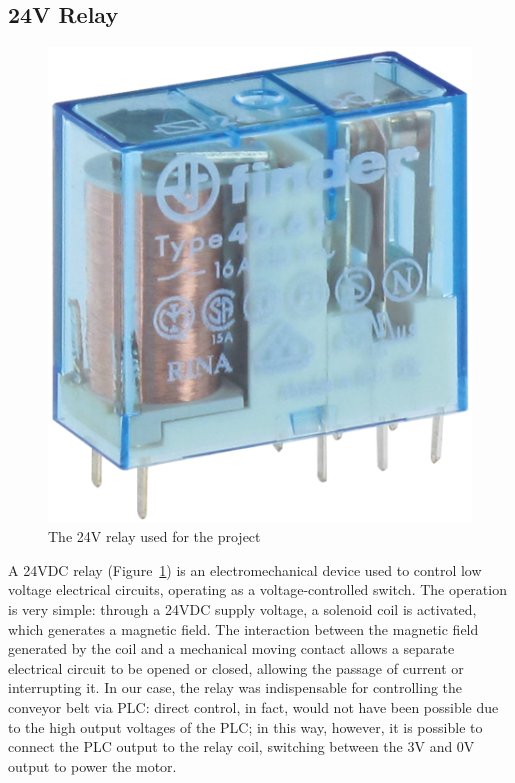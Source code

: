 \documentclass[a4paper,11pt]{report}
\theoremstyle{definition}
\theoremstyle{plain}
\begin{document}
        \subsection{24V Relay}
            \begin{figure}[htbp]
                \centering
                \includegraphics[scale=1]{images/rele.png}
                \caption{The 24V relay used for the project}
                \label{relay}
            \end{figure}
            A 24VDC relay (Figure~\ref{relay}) is an electromechanical device used to control low voltage electrical circuits, operating as a voltage-controlled switch. The operation is very simple: through a 24VDC supply voltage, a solenoid coil is activated, which generates a magnetic field. The interaction between the magnetic field generated by the coil and a mechanical moving contact allows a separate electrical circuit to be opened or closed, allowing the passage of current or interrupting it. \newline
            In our case, the relay was indispensable for controlling the conveyor belt via PLC: direct control, in fact, would not have been possible due to the high output voltages of the PLC; in this way, however, it is possible to connect the PLC output to the relay coil, switching between the 3V and 0V output to power the motor.
\end{document}
